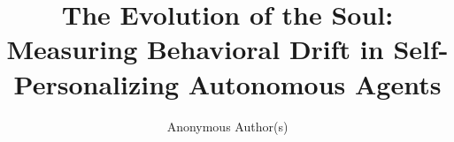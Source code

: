 \documentclass[sigconf,anonymous]{aamas}
\title[The Evolution of the Soul]{The Evolution of the Soul: Measuring Behavioral Drift in Self-Personalizing Autonomous Agents}
\author{Anonymous Author(s)}
\affiliation{
  \institution{Anonymous Institution}
  \city{City}
  \country{Country}}
\newif\ifwithappendix
\begin{document}


\maketitle













\FloatBarrier



\ifwithappendix
  \clearpage
  \setcounter{figure}{0}\setcounter{table}{0}
  \renewcommand{\thefigure}{S\arabic{figure}}\renewcommand{\theHfigure}{S\arabic{figure}}
  \renewcommand{\thetable}{S\arabic{table}}\renewcommand{\theHtable}{S\arabic{table}}
  
  
  \FloatBarrier
\fi
\end{document}

